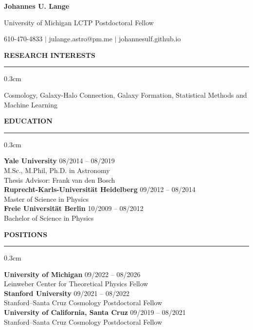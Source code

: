 \documentclass[11pt]{article}
\renewenvironment{section}[1]
  {
  \medskip
  {\color{yaleblue} \MakeUppercase{\bf #1}}
  \smallskip
  \hrule
  \medskip
  \begin{adjustwidth}{0.3cm}{}
  }
  {
  \end{adjustwidth}
  }
\newcommand{\entry}[3]{{\bf #1} \hfill {#2} \\ {#3}}
\begin{document}
\centerline{\color{yaleblue} \Huge \bf Johannes U. Lange}
\centerline{University of Michigan LCTP Postdoctoral Fellow}
\centerline{610-470-4833 $\vert$ julange.astro@pm.me $\vert$ johannesulf.github.io}
\bigskip

\begin{section}{Research Interests}
  Cosmology, Galaxy-Halo Connection, Galaxy Formation, Statistical Methods and Machine Learning
\end{section}

\begin{section}{Education}
  \entry{Yale University}{08/2014 -- 08/2019}{M.Sc., M.Phil, Ph.D. in Astronomy\\Thesis Advisor: Frank van den Bosch} \medskip \\
  \entry{Ruprecht-Karls-Universität Heidelberg}{09/2012 -- 08/2014}{Master of Science in Physics} \medskip \\
  \entry{Freie Universität Berlin}{10/2009 -- 08/2012}{Bachelor of Science in Physics}
\end{section}

\begin{section}{Positions}
  \entry{University of Michigan}{09/2022 -- 08/2026}{Leinweber Center for Theoretical Physics Fellow} \medskip \\
  \entry{Stanford University}{09/2021 -- 08/2022}{Stanford--Santa Cruz Cosmology Postdoctoral Fellow} \medskip \\
  \entry{University of California, Santa Cruz}{09/2019 -- 08/2021}{Stanford--Santa Cruz Cosmology Postdoctoral Fellow}
\end{section}
\end{document}
